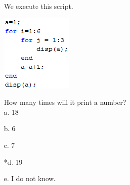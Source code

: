 
We execute this script.

\includegraphics[width=1.37519in,height=1.47937in]{../../Images/ProgrammingStructuresQ2.png} 

How many times will it print a number? \\

a. 18

b. 6

c. 7

*d. 19

e. I do not know. \\

